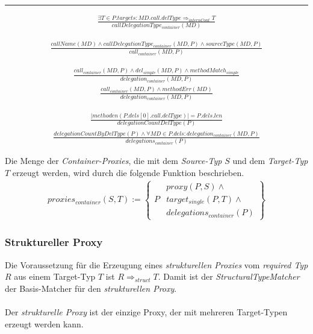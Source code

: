 \hrule


\begin{gather*}
\frac{\exists T \in \mathit{P.targets}:\mathit{MD.call.delType} \Rightarrow_{internCont} T}
{\mathit{callDelegationType_{container}(MD)}}
\end{gather*}

\begin{gather*}
\frac{\mathit{callName(MD)} \wedge \mathit{callDelegationType_{container}(MD,P)} \wedge \mathit{sourceType(MD,P)}}
{\mathit{call_{container}(MD,P)}}
\end{gather*}

\begin{gather*}
\frac{\mathit{call_{container}(MD, P)} \wedge \mathit{del_{simple}(MD, P)} \wedge \mathit{methodMatch_{simple}}}
{\mathit{delegation_{container}(MD, P)}}
\end{gather*}
\begin{gather*}
\frac{\mathit{call_{container}(MD, P)} \wedge \mathit{methodErr(MD)}}
{\mathit{delegation_{container}(MD, P)}}
\end{gather*}

\begin{gather*}
\frac{|\mathit{methoden(P.dels[0].call.delType)}| = P.dels.len}
{\mathit{delegationCountDelType(P)}}
\end{gather*}
\begin{gather*}
\frac{\mathit{delegationCountByDelType(P)} \wedge \forall \mathit{MD} \in P.dels: \mathit{delegation_{container}(MD,P)}}
{\mathit{delegations_{container}(P)}}
\end{gather*}




Die Menge der \emph{Container-Proxies}, die mit dem \emph{Source-Typ} $S$ und dem \emph{Target-Typ} $T$ erzeugt werden, wird durch die folgende Funktion beschrieben.
\begin{gather*}
\mathit{proxies_{container}(S,T)} := 
\left\{\begin{array}{l|l}
		& \mathit{proxy(P,S)}  \wedge \mathit{ } \\
	P	& \mathit{target_{single}(P,T)} \wedge \mathit{ } \\
		& \mathit{delegations_{container}(P)} 
		 \end{array}
\right\}
\end{gather*}
\subsubsection{Struktureller Proxy}
Die Voraussetzung für die Erzeugung eines \emph{strukturellen Proxies} vom \emph{required Typ} $R$ aus einem Target-Typ $T$ ist $R \Rightarrow_{struct} T$. Damit ist der \emph{StructuralTypeMatcher} der Basis-Matcher für den \emph{strukturellen Proxy}.
\\\\
Der \emph{strukturelle Proxy} ist der einzige Proxy, der mit mehreren Target-Typen erzeugt werden kann. 
